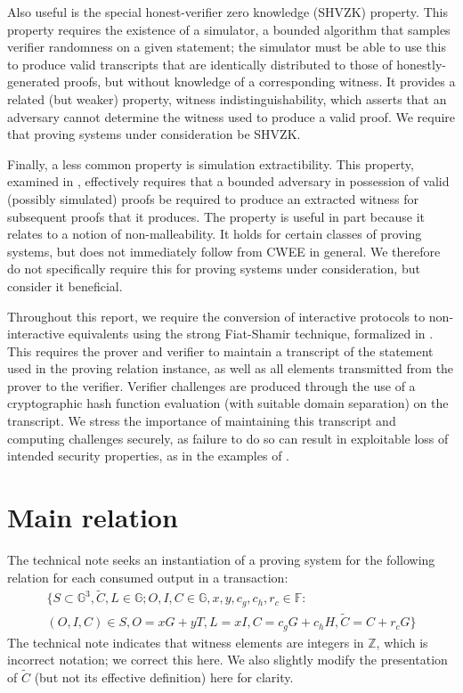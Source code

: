 \documentclass{article}
\theoremstyle{definition}
\newcommand{\GG}{\mathbb{G}}
\newcommand{\FF}{\mathbb{F}}
\newcommand{\wt}[1]{\widetilde{#1}}
\begin{document}
Also useful is the special honest-verifier zero knowledge (SHVZK) property.
This property requires the existence of a simulator, a bounded algorithm that samples verifier randomness on a given statement; the simulator must be able to use this to produce valid transcripts that are identically distributed to those of honestly-generated proofs, but without knowledge of a corresponding witness.
It provides a related (but weaker) property, witness indistinguishability, which asserts that an adversary cannot determine the witness used to produce a valid proof.
We require that proving systems under consideration be SHVZK.

Finally, a less common property is simulation extractibility.
This property, examined in \cite{sim_ext}, effectively requires that a bounded adversary in possession of valid (possibly simulated) proofs be required to produce an extracted witness for subsequent proofs that it produces.
The property is useful in part because it relates to a notion of non-malleability.
It holds for certain classes of proving systems, but does not immediately follow from CWEE in general.
We therefore do not specifically require this for proving systems under consideration, but consider it beneficial.

Throughout this report, we require the conversion of interactive protocols to non-interactive equivalents using the strong Fiat-Shamir technique, formalized in \cite{fs}.
This requires the prover and verifier to maintain a transcript of the statement used in the proving relation instance, as well as all elements transmitted from the prover to the verifier.
Verifier challenges are produced through the use of a cryptographic hash function evaluation (with suitable domain separation) on the transcript.
We stress the importance of maintaining this transcript and computing challenges securely, as failure to do so can result in exploitable loss of intended security properties, as in the examples of \cite{weak_fs}.


\section{Main relation}

The technical note seeks an instantiation of a proving system for the following relation for each consumed output in a transaction:
\begin{multline}
	\label{rel:original}
	\Big\{ S \subset \GG^3, \wt{C}, L \in \GG; O, I, C \in \GG, x, y, c_g, c_h, r_c \in \FF : \\
	(O, I, C) \in S, O = x G + y T, L = x I, C = c_g G + c_h H, \wt{C} = C + r_c G \Big\}
\end{multline}
The technical note indicates that witness elements are integers in $\mathbb{Z}$, which is incorrect notation; we correct this here.
We also slightly modify the presentation of $\wt{C}$ (but not its effective definition) here for clarity.
\end{document}
